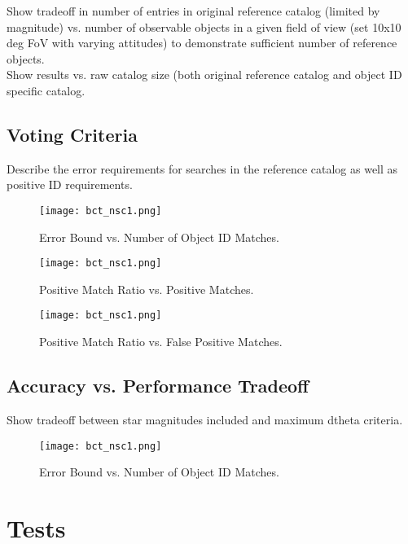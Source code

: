 \documentclass[]{DINOReportMemo}
\begin{document}
Show tradeoff in number of entries in original reference catalog (limited by magnitude) vs. number of observable objects in a given field of view (set 10x10 deg FoV with varying attitudes) to demonstrate sufficient number of reference objects. \\
Show results vs. raw catalog size (both original reference catalog and object ID specific catalog. \\

\subsection{Voting Criteria} Describe the error requirements for searches in the reference catalog as well as positive ID requirements. \\
\begin{figure}[H]
  \begin{center}
  \texttt{[image: bct\_nsc1.png]}
  \caption{Error Bound vs. Number of Object ID Matches.}
  \label{fig:boat1}
  \end{center}
\end{figure}
\begin{figure}[H]
  \begin{center}
  \texttt{[image: bct\_nsc1.png]}
  \caption{Positive Match Ratio vs. Positive Matches.}
  \label{fig:boat1}
  \end{center}
\end{figure}
\begin{figure}[H]
  \begin{center}
  \texttt{[image: bct\_nsc1.png]}
  \caption{Positive Match Ratio vs. False Positive Matches.}
  \label{fig:boat1}
  \end{center}
\end{figure}

\subsection{Accuracy vs. Performance Tradeoff} Show tradeoff between star magnitudes included and maximum dtheta criteria.
\begin{figure}[H]
  \begin{center}
  \texttt{[image: bct\_nsc1.png]}
  \caption{Error Bound vs. Number of Object ID Matches.}
  \label{fig:boat1}
  \end{center}
\end{figure}


\newpage
\section{Tests}
\end{document}

